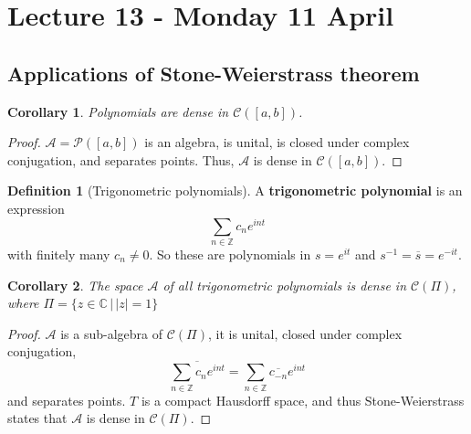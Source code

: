 \documentclass[10pt, oneside, reqno]{amsart}
\theoremstyle{plain}%
\newtheorem*{cor}{Corollary}
\theoremstyle{definition}
\newtheorem{defn}[thm]{Definition}
\theoremstyle{remark}
\newcommand{\Com}{\mathbb{C}}
\newcommand{\Z}{\mathbb{Z}}
\begin{document}

\section{Lecture 13 - Monday 11 April} %
\label{sec:lecture_13_monday_11_april}

\subsection{Applications of Stone-Weierstrass theorem} %
\label{sub:applications_of_stone_weierstrass_theorem}
\begin{cor}
    Polynomials are dense in $\mathcal C([a,b])$.  
\end{cor}
\begin{proof}
    $\mathcal A = \mathcal P([a,b])$ is an algebra, is unital, is closed under complex conjugation, and separates points.  Thus, $\mathcal A$ is dense in $\mathcal C([a,b])$.
\end{proof}

\begin{defn}[Trigonometric polynomials]
    A \textbf{trigonometric polynomial} is an expression \[
        \sum_{ n \in \Z} c_n e^{i n t}
    \] with finitely many $c_n \neq 0$. So these are polynomials in $s = e^{it}$ and $s^{-1} = \overline s = e^{-it}$.
\end{defn}

\begin{cor}
    The space $\mathcal A$ of all trigonometric polynomials is dense in $\mathcal C(\Pi)$, where $\Pi = \{ z \in \Com \, | \, |z | = 1 \}$
\end{cor}
\begin{proof}
    $\mathcal A$ is a sub-algebra of $\mathcal C(\Pi)$, it is unital, closed under complex conjugation, \[
        \overline{\sum_{n \in \Z} c_n e^{int}} = \sum_{n \in \Z} \overline{c_{-n}} e^{int}
    \] and separates points.  $T$ is a compact Hausdorff space, and thus Stone-Weierstrass states that $\mathcal{A}$ is dense in $\mathcal C(\Pi)$.  
\end{proof}
\end{document}
